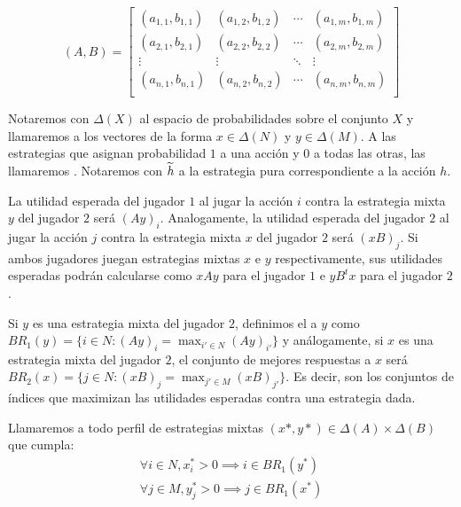 \begin{equation*}
    (A, B) =
    \begin{bmatrix}
        (a_{1, 1}, b_{1, 1})    & (a_{1, 2}, b_{1, 2})  & \cdots & (a_{1, m}, b_{1, m}) \\
        (a_{2, 1}, b_{2, 1})    & (a_{2, 2}, b_{2, 2})  & \cdots & (a_{2, m}, b_{2, m}) \\
        \vdots                  & \vdots                & \ddots & \vdots \\
        (a_{n,1}, b_{n, 1})    & (a_{n, 2}, b_{n, 2})  & \cdots & (a_{n, m}, b_{n, m}) \\
    \end{bmatrix}
\end{equation*}


Notaremos con $\Delta(X)$ al espacio de probabilidades sobre el conjunto $X$ y llamaremos  a los vectores de la forma $x \in \Delta(N)$ y $y \in \Delta(M)$. A las estrategias que asignan probabilidad $1$ a una acción y $0$ a todas las otras, las llamaremos . Notaremos con $\widetilde{h}$ a la estrategia pura correspondiente a la acción $h$.

La utilidad esperada del jugador $1$ al jugar la acción $i$ contra la estrategia mixta $y$ del jugador $2$ será $(Ay)_i$. Analogamente, la utilidad esperada del jugador $2$ al jugar la acción $j$ contra la estrategia mixta $x$ del jugador $2$ será $(xB)_j$. Si ambos jugadores juegan estrategias mixtas $x$ e $y$ respectivamente, sus utilidades esperadas podrán calcularse como $xAy$ para el jugador $1$ e $yB^tx$ para el jugador $2$.

Si $y$ es una estrategia mixta del jugador $2$, definimos el  a $y$ como $BR_1(y) = \{i \in N : (Ay)_i = \max_{i' \in N} (Ay)_{i'}\}$ y análogamente, si $x$ es una estrategia mixta del jugador $2$, el conjunto de mejores respuestas a $x$ será $BR_2(x) = \{j \in N : (xB)_j = \max_{j' \in M} (xB)_{j'}\}$. Es decir, son los conjuntos de índices que maximizan las utilidades esperadas contra una estrategia dada.

Llamaremos  a todo perfil de estrategias mixtas $(x*, y*) \in \Delta(A) \times \Delta(B)$ que cumpla:
\begin{gather}
    \forall i \in N, x^*_i > 0 \implies i \in BR_1(y^*) \\
    \forall j \in M, y^*_j > 0 \implies j \in BR_1(x^*)
\end{gather}

